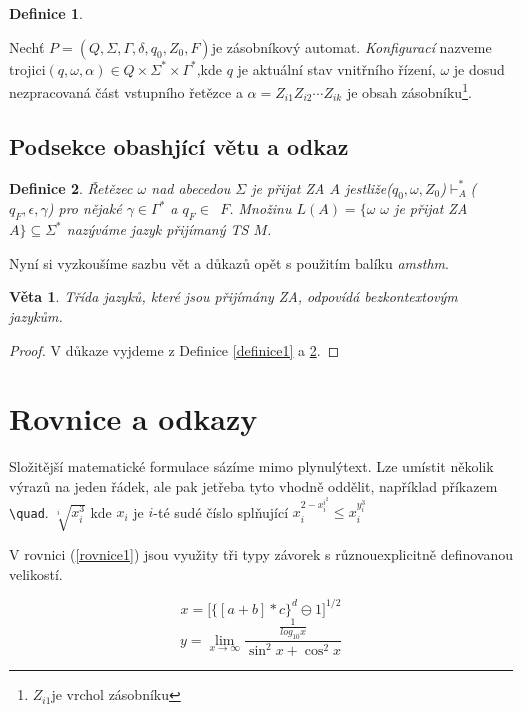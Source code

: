 \documentclass[a4paper, 11pt]{article}
\newtheorem{Definice}{Definice}
\newtheorem{veta}{Věta}
\begin{document}
\begin{twocolumn}
\begin{Definice}
\end{Definice}
Nechť $P = (Q,\Sigma,\Gamma,\delta,q_0,Z_0,F)$je zásobníkový automat. \emph{Konfigurací} nazveme trojici$(q,\omega,\alpha)\in Q \times \Sigma ^ \ast \times \Gamma ^ \ast$,kde $q$ je aktuální stav vnitřního řízení, $\omega$ je dosud nezpracovaná část vstupního řetězce a $\alpha = Z_{i1}Z_{i2} \dotsb Z_{ik}$ je obsah zásobníku\footnote{$Z_{i1}$je vrchol zásobníku}.

\subsection{Podsekce obashjící větu a odkaz}
\begin{Definice}
\label{definice2}
Řetězec $\omega$ nad abecedou $\Sigma$ je přijat ZA $A$ jestliže($q_0,\omega,Z_0$)$\vdash _A ^ \ast$($q_F,\epsilon,\gamma$) pro nějaké $\gamma \in \Gamma ^\ast$ a
$ q_F \in$~$F $. Množinu $L(A) = \{\omega$ \textbar $ \omega $ je přijat ZA $A \}
\subseteq \Sigma ^ \ast$ nazýváme jazyk přijímaný TS $M$.
\end{Definice}
Nyní si vyzkoušíme sazbu vět a důkazů opět s použitím balíku \emph{amsthm}.
\pagebreak
\setcounter{page}{1}
\pagestyle{plain}

\begin{veta}
Třída jazyků, které jsou přijímány ZA, odpovídá bezkontextovým jazykům. 
\end{veta}

\begin{proof}
V důkaze vyjdeme z Definice \ref{definice1} a \ref{definice2}.
\end{proof}

\section{Rovnice a odkazy}
Složitější matematické formulace sázíme mimo plynulýtext. Lze umístit několik výrazů na jeden řádek, ale pak jetřeba tyto vhodně oddělit, například příkazem \verb|\quad|.
$\sqrt[i]{x^3_i}$ \quad kde $x_i$ je $i$-té sudé číslo splňující \quad $x_i^{2-{x_i^{i^{2}}}} \leq x_i^{y_i^3}$

V rovnici (\ref{rovnice1}) jsou využity tři typy závorek s různouexplicitně definovanou velikostí.

\begin{equation}
\label{rovnice1}
x = \Bigg[\bigg\{[a+b]*c\bigg\}^d \ominus 1 \Bigg]^{1/2}
\end{equation}
\begin{equation*}
y = \lim\limits_{x\to\infty} \frac{\frac{1}{log_{10}x}}{\sin^2 x + \cos^2 x} 
\end{equation*}


\end{twocolumn}
\end{document}
